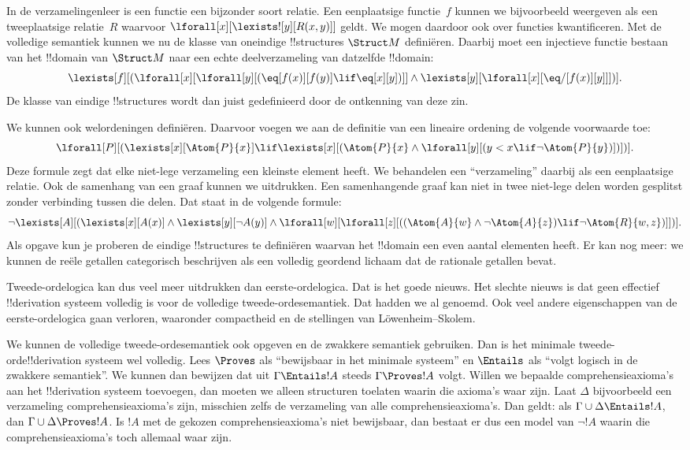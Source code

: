 \documentclass[openany]{memoir}
\begin{document}
In de verzamelingenleer is een functie een bijzonder soort relatie. Een
eenplaatsige functie~$f$ kunnen we bijvoorbeeld weergeven als een
tweeplaatsige relatie~$R$ waarvoor
$\lforall[x][\lexists![y][R(x,y)]]$ geldt. We mogen daardoor ook over
functies kwantificeren. Met de volledige semantiek kunnen we nu de klasse van
oneindige !!{structure}s $\Struct M$ definiëren. Daarbij moet een injectieve
functie bestaan van het !!{domain} van $\Struct M$ naar een echte
deelverzameling van datzelfde !!{domain}:
\[
\lexists[f][(\lforall[x][\lforall[y][(\eq[f(x)][f(y)] \lif \eq[x][y])]]
  \land \lexists[y][\lforall[x][\eq/[f(x)][y]]])].
\]
De klasse van eindige !!{structure}s wordt dan juist gedefinieerd door de
ontkenning van deze zin.

We kunnen ook welordeningen definiëren. Daarvoor voegen we aan de definitie
van een lineaire ordening de volgende voorwaarde toe:
\[
\lforall[P][(\lexists[x][\Atom{P}{x}] \lif \lexists[x][(\Atom{P}{x}
    \land \lforall[y][(y < x \lif \lnot \Atom{P}{y})])])].
\]
Deze formule zegt dat elke niet-lege verzameling een kleinste element heeft.
We behandelen een ``verzameling'' daarbij als een eenplaatsige relatie. Ook
de samenhang van een graaf kunnen we uitdrukken. Een samenhangende graaf kan
niet in twee niet-lege delen worden gesplitst zonder verbinding tussen die
delen. Dat staat in de volgende formule:
\[
\lnot \lexists[A][(\lexists[x][A(x)] \land \lexists[y][\lnot A(y)]
  \land \lforall[w][\lforall[z][((\Atom{A}{w} \land \lnot \Atom{A}{z})
      \lif \lnot \Atom{R}{w,z})]])].
\]
Als opgave kun je proberen de eindige !!{structure}s te definiëren waarvan
het !!{domain} een even aantal elementen heeft. Er kan nog meer: we kunnen de
reële getallen categorisch beschrijven als een volledig geordend lichaam dat
de rationale getallen bevat.

Tweede-ordelogica kan dus veel meer uitdrukken dan eerste-ordelogica. Dat is
het goede nieuws. Het slechte nieuws is dat geen effectief !!{derivation}
systeem volledig is voor de volledige tweede-ordesemantiek. Dat hadden we al
genoemd. Ook veel andere eigenschappen van de eerste-ordelogica gaan verloren,
waaronder compactheid en de stellingen van L\"owenheim--Skolem.

We kunnen de volledige tweede-ordesemantiek ook opgeven en de zwakkere
semantiek gebruiken. Dan is het minimale tweede-orde!!{derivation} systeem
wel volledig. Lees $\Proves$ als ``bewijsbaar in het minimale systeem'' en
$\Entails$ als ``volgt logisch in de zwakkere semantiek''. We kunnen dan
bewijzen dat uit $\Gamma \Entails !A$ steeds $\Gamma \Proves !A$ volgt. Willen we
bepaalde comprehensieaxioma's aan het !!{derivation} systeem toevoegen, dan
moeten we alleen structuren toelaten waarin die axioma's waar zijn. Laat
$\Delta$ bijvoorbeeld een verzameling comprehensieaxioma's zijn, misschien
zelfs de verzameling van alle comprehensieaxioma's. Dan geldt: als
$\Gamma \cup \Delta \Entails !A$, dan
$\Gamma \cup \Delta \Proves !A$. Is $!A$ met de gekozen
comprehensieaxioma's niet bewijsbaar, dan bestaat er dus een model van
$\lnot !A$ waarin die comprehensieaxioma's toch allemaal waar zijn.
\end{document}
